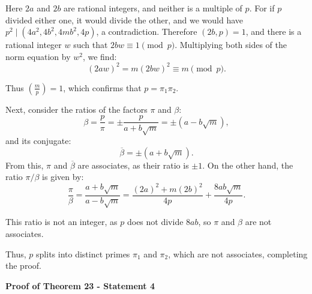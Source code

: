 \documentclass{article}
\newenvironment{proofbox}
  {\begin{mdframed}[linewidth=1pt,linecolor=black,backgroundcolor=white]\noindent\ignorespaces}
  {\end{mdframed}}
\begin{document}
\begin{proofbox}
Here \( 2a \) and \( 2b \) are rational integers, and neither is a multiple of \( p \). For if \( p \) divided either one, it would divide the other, and we would have \( p^2 \mid (4a^2, 4b^2, 4mb^2, 4p) \), a contradiction. Therefore \( (2b, p) = 1 \), and there is a rational integer \( w \) such that \( 2bw \equiv 1 \pmod{p} \). Multiplying both sides of the norm equation by \( w^2 \), we find:
\[
(2aw)^2 = m(2bw)^2 \equiv m \pmod{p}.
\]

Thus \( \left( \frac{m}{p} \right) = 1 \), which confirms that \( p = \pi_1 \pi_2 \).

Next, consider the ratios of the factors \( \pi \) and \( \beta \):
\[
\beta = \frac{p}{\pi} = \pm \frac{p}{a + b\sqrt{m}} = \pm (a - b\sqrt{m}),
\]
and its conjugate:
\[
\overline{\beta} = \pm (a + b\sqrt{m}).
\]
From this, \( \pi \) and \( \overline{\beta} \) are associates, as their ratio is \( \pm 1 \). On the other hand, the ratio \( \pi / \beta \) is given by:
\[
\frac{\pi}{\beta} = \frac{a + b\sqrt{m}}{a - b\sqrt{m}} = \frac{(2a)^2 + m(2b)^2}{4p} + \frac{8ab\sqrt{m}}{4p}.
\]

This ratio is not an integer, as \( p \) does not divide \( 8ab \), so \( \pi \) and \( \beta \) are not associates.

Thus, \( p \) splits into distinct primes \( \pi_1 \) and \( \pi_2 \), which are not associates, completing the proof.
\end{proofbox}

\textbf{Proof of Theorem 23 - Statement 4}\\
\end{document}
